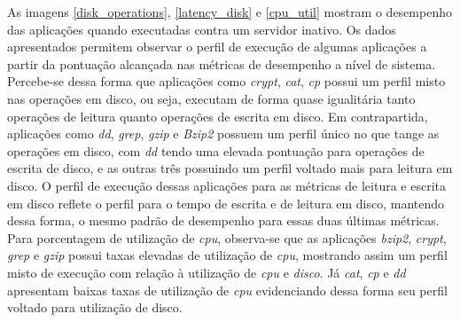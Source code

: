 As imagens \ref{disk_operations}, \ref{latency_disk} e \ref{cpu_util} mostram o desempenho das aplicações quando executadas contra um servidor inativo. Os dados apresentados permitem observar o perfil de execução de algumas aplicações a partir da pontuação alcançada nas métricas de desempenho a nível de sistema. Percebe-se dessa forma que aplicações como \textit{crypt}, \textit{cat}, \textit{cp} possui um perfil misto nas operações em disco, ou seja, executam de forma quase igualitária tanto operações de leitura quanto operações de escrita em disco. Em contrapartida, aplicações como \textit{dd}, \textit{grep}, \textit{gzip} e \textit{Bzip2} possuem um perfil único no que tange as operações em disco, com \textit{dd} tendo uma elevada pontuação para operações de escrita de disco, e as outras três possuindo um perfil voltado mais para leitura em disco. O perfil de execução dessas aplicações para as métricas de leitura e escrita em disco reflete o perfil para o tempo de escrita e de leitura em disco, mantendo dessa forma, o mesmo padrão de desempenho para essas duas últimas métricas. Para porcentagem de utilização de \textit{cpu}, observa-se que as aplicações \textit{bzip2}, \textit{crypt}, \textit{grep} e \textit{gzip} possui taxas elevadas de utilização de \textit{cpu}, mostrando assim um  perfil misto de execução com relação à utilização de \textit{cpu} e \textit{disco}. Já \textit{cat}, \textit{cp} e \textit{dd} apresentam baixas taxas de utilização de \textit{cpu} evidenciando dessa forma seu perfil voltado para utilização de disco.

